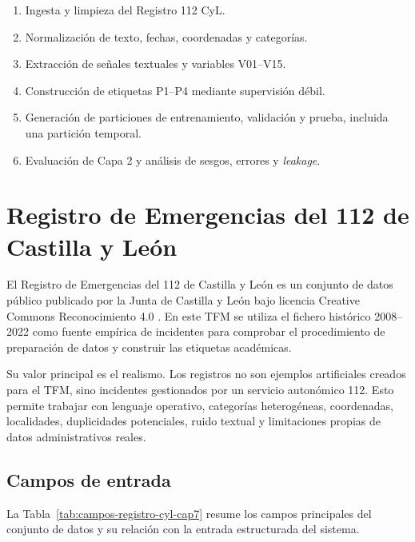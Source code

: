 \begin{enumerate}
    \item Ingesta y limpieza del Registro 112 CyL.
    \item Normalización de texto, fechas, coordenadas y categorías.
    \item Extracción de señales textuales y variables V01--V15.
    \item Construcción de etiquetas P1--P4 mediante supervisión débil.
    \item Generación de particiones de entrenamiento, validación y prueba, incluida una partición temporal.
    \item Evaluación de Capa 2 y análisis de sesgos, errores y \textit{leakage}.
\end{enumerate}

\section{Registro de Emergencias del 112 de Castilla y León}

El Registro de Emergencias del 112 de Castilla y León es un conjunto de datos público publicado por la Junta de Castilla y León bajo licencia Creative Commons Reconocimiento 4.0 \cite{Registro112CyL}. En este TFM se utiliza el fichero histórico 2008--2022 como fuente empírica de incidentes para comprobar el procedimiento de preparación de datos y construir las etiquetas académicas.

Su valor principal es el realismo. Los registros no son ejemplos artificiales creados para el TFM, sino incidentes gestionados por un servicio autonómico 112. Esto permite trabajar con lenguaje operativo, categorías heterogéneas, coordenadas, localidades, duplicidades potenciales, ruido textual y limitaciones propias de datos administrativos reales.

\subsection{Campos de entrada}

La Tabla~\ref{tab:campos-registro-cyl-cap7} resume los campos principales del conjunto de datos y su relación con la entrada estructurada del sistema.

